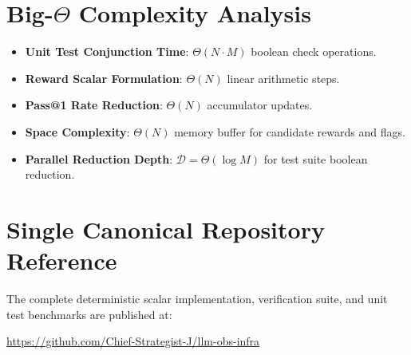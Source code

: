 \documentclass[11pt,a4paper]{article}
\theoremstyle{definition}
\begin{document}
\section{Big-$\Theta$ Complexity Analysis}

\begin{itemize}
    \item \textbf{Unit Test Conjunction Time}: $\Theta(N \cdot M)$ boolean check operations.
    \item \textbf{Reward Scalar Formulation}: $\Theta(N)$ linear arithmetic steps.
    \item \textbf{Pass@1 Rate Reduction}: $\Theta(N)$ accumulator updates.
    \item \textbf{Space Complexity}: $\Theta(N)$ memory buffer for candidate rewards and flags.
    \item \textbf{Parallel Reduction Depth}: $\mathcal{D} = \Theta(\log M)$ for test suite boolean reduction.
\end{itemize}

\section{Single Canonical Repository Reference}

The complete deterministic scalar implementation, verification suite, and unit test benchmarks are published at:
\begin{center}
\url{https://github.com/Chief-Strategist-J/llm-obs-infra}
\end{center}
\end{document}

